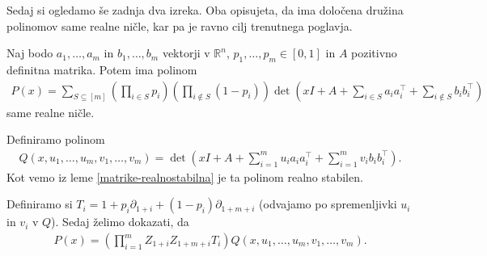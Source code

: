 Sedaj si ogledamo še zadnja dva izreka. Oba opisujeta, da ima določena družina polinomov same realne ničle, kar pa je ravno cilj trenutnega poglavja.
\begin{izrek}\label{realne-nicle-velik-polinom-1}
    Naj bodo \(a_1, \ldots, a_m\) in \(b_1, \ldots, b_m\) vektorji v \(\mathbb R^n\), \(p_1,\ldots, p_m \in [0,1]\) in \(A\) pozitivno definitna matrika. Potem ima polinom
    \begin{align*}
        P(x) = \sum_{S\subseteq [m]} \left(\prod_{i\in S} p_i\right)\left(\prod_{i\notin S} \left(1-p_i\right)\right) \det\left(xI + A + \sum_{i\in S} a_i a_i^\top + \sum_{i\notin S} b_i b_i^\top\right)
    \end{align*}
    same realne ničle.
\end{izrek}
\begin{dokaz}
    Definiramo polinom
    \begin{align*}
        Q(x, u_1, \ldots, u_m, v_1, \ldots, v_m) = \det\left(xI + A + \sum_{i=1}^m u_i a_i a_i^\top + \sum_{i=1}^m v_i b_i b_i^\top\right).
    \end{align*}
    Kot vemo iz leme \ref{matrike-realnostabilna} je ta polinom realno stabilen.

    Definiramo si \(T_i = 1+p_i\partial_{1+i} + (1-p_i)\partial_{1+m+i}\) (odvajamo po spremenljivki \(u_i\) in \(v_i\) v \(Q\)). Sedaj želimo dokazati, da
    \begin{align*}
        P(x) = \left(\prod_{i=1}^m Z_{1+i}Z_{1+m+i}T_i\right)Q(x, u_1, \ldots, u_m, v_1, \ldots, v_m).
    \end{align*}


\end{dokaz}
